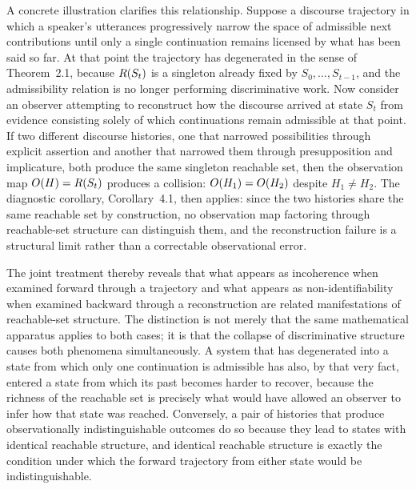A concrete illustration clarifies this relationship. Suppose a discourse trajectory in which a speaker's utterances progressively narrow the space of admissible next contributions until only a single continuation remains licensed by what has been said so far. At that point the trajectory has degenerated in the sense of Theorem~2.1, because $R(S_t)$ is a singleton already fixed by $S_0, \dots, S_{t-1}$, and the admissibility relation is no longer performing discriminative work. Now consider an observer attempting to reconstruct how the discourse arrived at state $S_t$ from evidence consisting solely of which continuations remain admissible at that point. If two different discourse histories, one that narrowed possibilities through explicit assertion and another that narrowed them through presupposition and implicature, both produce the same singleton reachable set, then the observation map $O(H) = R(S_t)$ produces a collision: $O(H_1) = O(H_2)$ despite $H_1 \neq H_2$. The diagnostic corollary, Corollary~4.1, then applies: since the two histories share the same reachable set by construction, no observation map factoring through reachable-set structure can distinguish them, and the reconstruction failure is a structural limit rather than a correctable observational error.

The joint treatment thereby reveals that what appears as incoherence when examined forward through a trajectory and what appears as non-identifiability when examined backward through a reconstruction are related manifestations of reachable-set structure. The distinction is not merely that the same mathematical apparatus applies to both cases; it is that the collapse of discriminative structure causes both phenomena simultaneously. A system that has degenerated into a state from which only one continuation is admissible has also, by that very fact, entered a state from which its past becomes harder to recover, because the richness of the reachable set is precisely what would have allowed an observer to infer how that state was reached. Conversely, a pair of histories that produce observationally indistinguishable outcomes do so because they lead to states with identical reachable structure, and identical reachable structure is exactly the condition under which the forward trajectory from either state would be indistinguishable.

